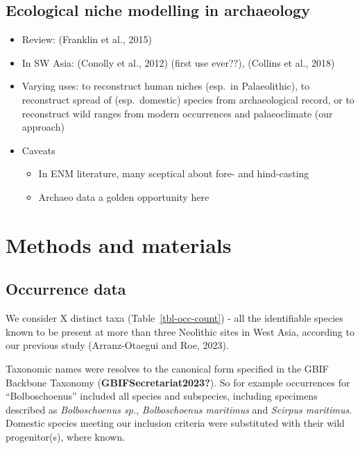\documentclass[
  number,
  review]{elsarticle}
\providecommand{\tightlist}{%
  \setlength{\itemsep}{0pt}\setlength{\parskip}{0pt}}\usepackage{longtable,booktabs,array}
\begin{document}
\subsection{Ecological niche modelling in
archaeology}\label{ecological-niche-modelling-in-archaeology}

\begin{itemize}
\tightlist
\item
  Review: (Franklin et al., 2015)
\item
  In SW Asia: (Conolly et al., 2012) (first use ever??), (Collins et
  al., 2018)
\item
  Varying uses: to reconstruct human niches (esp.~in Palaeolithic), to
  reconstruct spread of (esp.~domestic) species from archaeological
  record, or to reconstruct wild ranges from modern occurrences and
  palaeoclimate (our approach)
\item
  Caveats

  \begin{itemize}
  \tightlist
  \item
    In ENM literature, many sceptical about fore- and hind-casting
  \item
    Archaeo data a golden opportunity here
  \end{itemize}
\end{itemize}

\section{Methods and materials}\label{methods-and-materials}

\subsection{Occurrence data}\label{occurrence-data}

We consider X distinct taxa (Table~\ref{tbl-occ-count}) - all the
identifiable species known to be present at more than three Neolithic
sites in West Asia, according to our previous study (Arranz-Otaegui and
Roe, 2023).

Taxonomic names were resolves to the canonical form specified in the
GBIF Backbone Taxonomy (\textbf{GBIFSecretariat2023?}). So for example
occurrences for ``Bolboschoenus'' included all species and subspecies,
including specimens described as \emph{Bolboschoenus sp.},
\emph{Bolboschoenus maritimus} and \emph{Scirpus maritimus}. Domestic
species meeting our inclusion criteria were substituted with their wild
progenitor(s), where known.
\end{document}
